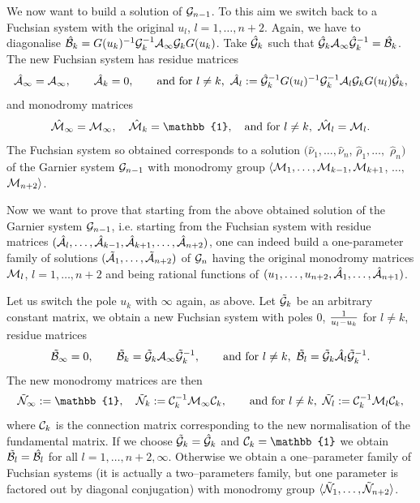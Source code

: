 \documentclass[12pt]{article}
\newcommand{\ID}{\mathbb{1}}
\theoremstyle{definition}
\theoremstyle{theorem}
\begin{document}
We now want to build a solution of ${\cal G}_{n-1}$. To this aim we
switch back to a Fuchsian system with the original $u_l$, 
$l=1,\dots,n+2$. Again, we have to diagonalise 
$\hat{\cal B}_k= G(u_k)^{-1} {\cal G}_k^{-1} {\cal A}_\infty
{\cal G}_k G(u_k)$. Take $\hat{\cal G}_k$ such that 
$\hat{\cal G}_k  {\cal A}_\infty \hat{\cal G}_k^{-1} =\hat{\cal B}_k$.
The new Fuchsian system has residue matrices
$$
\hat{\cal A}_\infty={\cal A}_\infty,\qquad
\hat{\cal A}_k= 0,\qquad 
\hbox{and for $l\neq k$, }\,
\hat{\cal A}_l:= \hat{\cal G}_k^{-1} G(u_l)^{-1} {\cal G}_k^{-1} 
{\cal A}_l {\cal G}_k G(u_l) \hat{\cal G}_k ,
$$
and monodromy matrices
$$
\hat{\cal M}_\infty={\cal M}_\infty,\quad
\hat{\cal  M}_k=\ID,\quad
\hbox{and for $l\neq k$, }\,\hat{\cal M}_l= {\cal M}_l.
$$
The Fuchsian system so obtained corresponds to a solution 
$(\hat\nu_1,\dots,\hat\nu_n$, $\hat\rho_1,\dots,$ $\hat\rho_n)$ 
of the Garnier system ${\cal G}_{n-1}$ with monodromy group
$\langle{\cal M}_1,\dots,{\cal M}_{k-1},{\cal M}_{k+1}$, $\dots,$
${\cal M}_{n+2}\rangle$.

Now we want to prove that starting from the above obtained  
solution of the Garnier system ${\cal G}_{n-1}$, i.e. starting
from the Fuchsian system with residue matrices 
$(\hat{\cal A}_l,\dots,\hat{\cal A}_{k-1},\hat{\cal A}_{k+1},
\dots,\hat{\cal A}_{n+2})$, one can indeed build a one-parameter 
family of solutions
$(\tilde{\cal A}_1,\dots,\tilde{\cal A}_{n+2})$ of ${\cal G}_n$ having the
original monodromy matrices ${\cal M}_l$, $l=1,\dots,n+2$ and 
being rational functions of
$(u_1,\dots,u_{n+2},\hat{\cal A}_1,\dots,\hat{\cal A}_{n+1})$. 

Let us switch the pole $u_k$ with $\infty$ again, as above. Let
$\tilde{\cal G}_k$ be an arbitrary constant matrix, we obtain
a new Fuchsian system with poles $0$, ${1\over u_l-u_k}$ for 
$l\neq k$, residue matrices 
$$
\tilde{\cal B}_\infty=0,\qquad
\tilde{\cal B}_k= \tilde{\cal G}_k {\cal A}_\infty \tilde{\cal G}_k^{-1},
\qquad \hbox{and for $l\neq k$, }\, 
\tilde{\cal B}_l= \tilde{\cal G}_k\hat{\cal A}_l 
\tilde{\cal G}_k^{-1}.
$$
The new monodromy matrices are then
$$
\tilde{\cal N}_\infty:=\ID,\quad
\tilde{\cal N}_k:={\cal C}_k^{-1}{\cal M}_\infty{\cal C}_k,
\qquad \hbox{and for $l\neq k$, }\, 
\tilde{\cal N}_l:= {\cal C}_k^{-1}{\cal M}_l{\cal C}_k,
$$
where ${\cal C}_k$ is the connection matrix corresponding to the new 
normalisation of the fundamental matrix. If we choose 
$\tilde{\cal G}_k=\hat{\cal G}_k$ and ${\cal C}_k=\ID$ we obtain 
$\tilde{\cal B}_l=\hat{\cal B}_l$ for all $l=1,\dots,n+2,\infty$. 
Otherwise we obtain a one--parameter family of Fuchsian systems 
(it is actually a two--parameters family, but one 
parameter is factored out by diagonal conjugation) with monodromy 
group $\langle\tilde{\cal N}_1,\dots,\tilde{\cal N}_{n+2}\rangle$.
\end{document}
